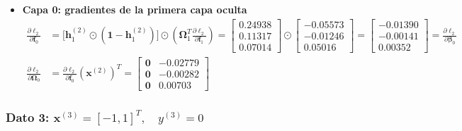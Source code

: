 \documentclass[10pt,a4paper]{article}
\begin{document}
\begin{itemize}
    \item \textbf{Capa 0: gradientes de la primera capa oculta}
    \begin{align*}
    \frac{\partial \ell_2}{\partial \mathbf{f}_0} &= \big[\mathbf{h}_1^{(2)} \odot (\mathbf{1} - \mathbf{h}_1^{(2)})\big] \odot \left(\boldsymbol{\Omega}_1^T \frac{\partial \ell_2}{\partial \mathbf{f}_1}\right) = \begin{bmatrix} 0.24938 \\ 0.11317 \\ 0.07014 \end{bmatrix} \odot \begin{bmatrix} -0.05573 \\ -0.01246 \\ 0.05016 \end{bmatrix} = \mathbf{\begin{bmatrix} -0.01390 \\ -0.00141 \\ 0.00352 \end{bmatrix}} = \frac{\partial \ell_2}{\partial \boldsymbol{\beta}_0} \\[0.1cm]
    \frac{\partial \ell_2}{\partial \boldsymbol{\Omega}_0} &= \frac{\partial \ell_2}{\partial \mathbf{f}_0} (\mathbf{x}^{(2)})^T = \mathbf{\begin{bmatrix} 0 & -0.02779 \\ 0 & -0.00282 \\ 0 & 0.00703 \end{bmatrix}}
    \end{align*}
\end{itemize}

\subsubsection*{Dato 3: $\mathbf{x}^{(3)} = [-1, 1]^T, \quad y^{(3)} = 0$}
\end{document}
